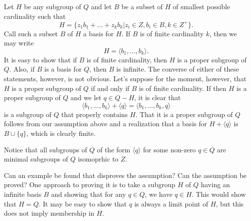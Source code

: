 \documentclass[12pt]{article}
\begin{document}
Let $H$ be any subgroup of $Q$ and
let $B$ be a subset of $H$ of smallest possible cardinality such that
\begin{equation*}
H=\{z_1b_1+\dots+z_kb_k|z_i\in Z, b_i\in B,k\in Z^{+}\}.
\end{equation*}
Call such a subset $B$ of $H$ a basis for $H$.  If $B$ is of finite
cardinality $k$, then we may write
\begin{equation*}
H = \langle b_1,\dots,b_k\rangle.
\end{equation*}
It is easy to show that if $B$ is of finite cardinality, then $H$ is a proper
subgroup of $Q$.  Also, if $B$ is a basis for $Q$, then $B$ is infinite.
The converse of either of these statements, however, is not obvious.
Let's suppose for the moment, however, that $H$ is a proper subgroup
of $Q$ if and only if $B$ is of finite cardinality.
If then $H$ is a proper subgroup of $Q$ and we let $q\in Q-H$, it is clear that
\begin{equation*}
\langle b_1,\dots,b_k\rangle+\langle q\rangle=\langle b_1,\dots,b_k,q\rangle
\end{equation*}
is a subgroup of $Q$ that properly contains $H$.  That it is a proper subgroup
of $Q$ follows from our assumption above and a realization that a basis
for $H+\langle q\rangle$ is $B\cup\{q\}$, which is clearly finite.

Notice that all subgroups of $Q$ of the form $\langle q\rangle$ for some non-zero $q\in Q$
are minimal subgroups of $Q$ isomoprhic to $Z$.

Can an example be found that disproves the assumption?  Can the assumption
be proved?  One approach to proving it is to take a subgroup $H$ of $Q$
having an infinite basis $B$ and showing that for any $q\in Q$, we have $q\in H$.
This would show that $H=Q$.  It may be easy to show that $q$ is always a limit
point of $H$, but this does not imply membership in $H$.
\end{document}
